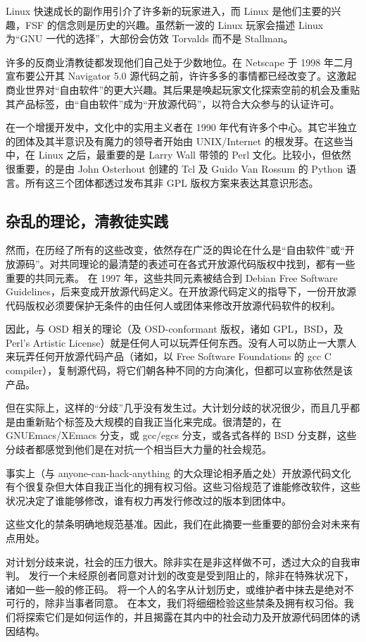 Linux 快速成长的副作用引介了许多新的玩家进入，而 Linux 是他们主要的兴趣，FSF 的信念则是历史的兴趣。虽然新一波的 Linux 玩家会描述 Linux 为“GNU 一代的选择”，大部份会仿效 Torvalds 而不是 Stallman。

许多的反商业清教徒都发现他们自己处于少数地位。在 Netscape 于 1998 年二月宣布要公开其 Navigator 5.0 源代码之前，许许多多的事情都已经改变了。这激起商业世界对“自由软件”的更大兴趣。其后果是唤起玩家文化探索空前的机会及重贴其产品标签，由“自由软件”成为“开放源代码”，以符合大众参与的认证许可。

在一个增援开发中，文化中的实用主义者在 1990 年代有许多个中心。其它半独立的团体及其半意识及有魔力的领导者开始由 UNIX/Internet 的根发芽。在这些当中，在 Linux 之后，最重要的是 Larry Wall 带领的 Perl 文化。比较小，但依然很重要，的是由 John Osterhout 创建的 Tcl 及 Guido Van Rossum 的 Python 语言。所有这三个团体都透过发布其非 GPL 版权方案来表达其意识形态。


\subsection{杂乱的理论，清教徒实践}
然而，在历经了所有的这些改变，依然存在广泛的舆论在什么是“自由软件”或“开放源码”。对共同理论的最清楚的表述可在各式开放源代码版权中找到，都有一些重要的共同元素。
在 1997 年，这些共同元素被结合到 Debian Free Software Guidelines，后来变成开放源代码定义。在开放源代码定义的指导下，一份开放源代码版权必须要保护无条件的由任何人或团体来修改开放源代码软件的权利。

因此，与 OSD 相关的理论（及 OSD-conformant 版权，诸如 GPL，BSD，及 Perl's Artistic License）就是任何人可以玩弄任何东西。没有人可以防止一大票人来玩弄任何开放源代码产品（诸如，以 Free Software Foundations 的 gcc C compiler），复制源代码，将它们朝各种不同的方向演化，但都可以宣称依然是该产品。

但在实际上，这样的“分歧”几乎没有发生过。大计划分歧的状况很少，而且几乎都是由重新贴个标签及大规模的自我正当化来完成。很清楚的，在 GNUEmacs/XEmacs 分支，或 gcc/egcs 分支，或各式各样的 BSD 分支群，这些分歧者都感觉到他们是在对抗一个相当巨大力量的社会规范。

事实上（与 anyone-can-hack-anything 的大众理论相矛盾之处）开放源代码文化有个很复杂但大体自我正当化的拥有权习俗。这些习俗规范了谁能修改软件，这些状况决定了谁能够修改，谁有权力再发行修改过的版本到团体中。

这些文化的禁条明确地规范基准。因此，我们在此摘要一些重要的部份会对未来有点用处。

对计划分歧来说，社会的压力很大。除非实在是非这样做不可，透过大众的自我审判。
发行一个未经原创者同意对计划的改变是受到阻止的，除非在特殊状况下，诸如一些一般的修正码。
将一个人的名字从计划历史，或维护者中抹去是绝对不可行的，除非当事者同意。
在本文，我们将细细检验这些禁条及拥有权习俗。我们将探索它们是如何运作的，并且揭露在其内中的社会动力及开放源代码团体的诱因结构。

